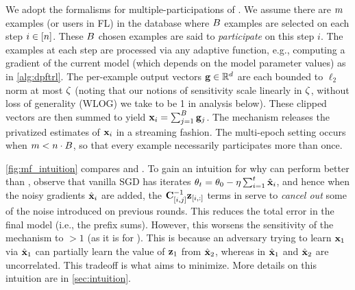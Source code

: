\documentclass{article}
\begin{document}
 We adopt the formalisms for multiple-participations of \citet{choquette2022multi}. We assume there are $m$ examples (or users in FL) in the database where $B$ examples are selected on each step $i \in [n]$. These $B$ chosen examples are said to \emph{participate} on this step $i$.
The examples at each step are processed via any adaptive function, e.g., computing a gradient of the current model (which depends on the model parameter values) as in \cref{alg:dpftrl}. The per-example output vectors $\mathbf{g} \in \mathbb{R}^d$ are each bounded to $\ell_2$ norm at most $\zeta$ (noting that our notions of sensitivity scale linearly in $\zeta$, without loss of generality (WLOG) we take to be 1 in analysis below). These clipped vectors are then summed to yield $\mathbf{x}_i = \sum_{j=1}^B \mathbf{g}_j$. The \MFFTRL mechanism releases the privatized estimates of $\mathbf{x}_i$ in a streaming fashion. The multi-epoch setting occurs when $m < n \cdot B$, so that every example necessarily participates more than once.

\cref{fig:mf_intuition} compares \dpsgd and \mfftrl. To gain an intuition for why \mfftrl can perform better than \dpsgd, observe that vanilla SGD has iterates $\theta_t = \theta_0 - \eta \sum_{i=1}^t \hat{\mathbf{x}}_i$, and hence when the noisy gradients $\hat{\mathbf{x}}_i$ are added, the $\mathbf{C}^{-1}_{[i, j]}\mathbf{z}_{[i, :]}$ terms in \mfftrl serve to \emph{cancel out} some of the noise introduced on previous rounds. This reduces the total error in the final model (i.e., the prefix sums). 
However, this worsens the sensitivity of the mechanism to $>\!\! 1$ (as it is for \dpsgd). This is because an adversary trying to learn $\mathbf{x}_1$ via $\hat{\mathbf{x}}_1$ can partially learn the value of $\mathbf{z}_1$ from $\hat{\mathbf{x}}_2$, whereas in \dpsgd $\hat{\mathbf{x}}_1$ and $\hat{\mathbf{x}}_2$ are uncorrelated. This tradeoff is what \mfftrl aims to minimize. More details on this intuition are in \cref{sec:intuition}.
\end{document}
